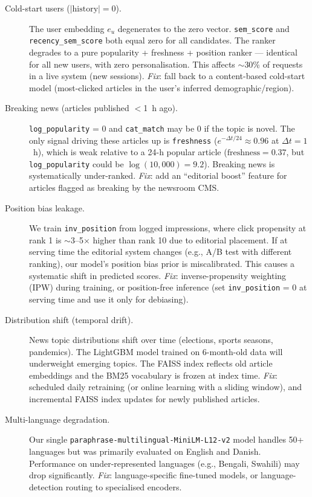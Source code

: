 \documentclass[11pt,a4paper]{article}
\newcommand{\feature}[1]{\texttt{#1}}
\begin{document}
\begin{description}
  \item[Cold-start users ($|\text{history}|{=}0$).] The user embedding
        $e_u$ degenerates to the zero vector. \feature{sem\_score} and
        \feature{recency\_sem\_score} both equal zero for all candidates.
        The ranker degrades to a pure popularity + freshness + position ranker
        --- identical for all new users, with zero personalisation. This affects
        $\sim$30\% of requests in a live system (new sessions). \emph{Fix}:
        fall back to a content-based cold-start model (most-clicked articles in
        the user's inferred demographic/region).

  \item[Breaking news (articles published $<$1~h ago).] \feature{log\_popularity}
        = 0 and \feature{cat\_match} may be 0 if the topic is novel. The only
        signal driving these articles up is \feature{freshness}
        ($e^{-\Delta t/24} \approx 0.96$ at $\Delta t = 1$~h), which is weak
        relative to a 24-h popular article ($\text{freshness} = 0.37$, but
        \feature{log\_popularity} could be $\log(10,000) = 9.2$). Breaking news
        is systematically under-ranked. \emph{Fix}: add an
        ``editorial boost'' feature for articles flagged as breaking by the
        newsroom CMS.

  \item[Position bias leakage.] We train \feature{inv\_position} from logged
        impressions, where click propensity at rank 1 is $\sim$3--5$\times$
        higher than rank 10 due to editorial placement. If at serving time the
        editorial system changes (e.g., A/B test with different ranking), our
        model's position bias prior is miscalibrated. This causes a systematic
        shift in predicted scores. \emph{Fix}: inverse-propensity weighting
        (IPW) during training, or position-free inference (set
        \feature{inv\_position} = 0 at serving time and use it only for
        debiasing).

  \item[Distribution shift (temporal drift).] News topic distributions shift
        over time (elections, sports seasons, pandemics). The LightGBM model
        trained on 6-month-old data will underweight emerging topics. The FAISS
        index reflects old article embeddings and the BM25 vocabulary is
        frozen at index time. \emph{Fix}: scheduled daily retraining (or online
        learning with a sliding window), and incremental FAISS index updates for
        newly published articles.

  \item[Multi-language degradation.] Our single
        \texttt{paraphrase-multilingual-MiniLM-L12-v2} model handles 50+
        languages but was primarily evaluated on English and Danish. Performance
        on under-represented languages (e.g., Bengali, Swahili) may drop
        significantly. \emph{Fix}: language-specific fine-tuned models, or
        language-detection routing to specialised encoders.
\end{description}
\end{document}
